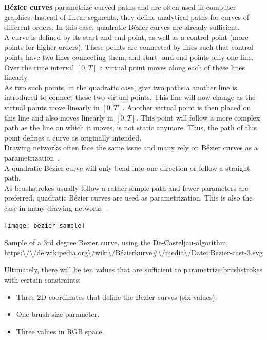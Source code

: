 \textbf{Bézier curves} parametrize curved paths and are often used in computer graphics.
Instead of linear segments, they define analytical paths for curves of different orders.
In this case, quadratic Bézier curves are already sufficient.\\
A curve is defined by its start and end point, as well as a control point (more points for higher orders).
These points are connected by lines such that control points have two lines connecting them, and start- and end points only one line.
Over the time interval $[0, T]$ a virtual point moves along each of these lines linearly.\\
As two such points, in the quadratic case, give two paths a another line is introduced to connect these two virtual points.
This line will now change as the virtual points move linearly in $[0, T]$.
Another virtual point is then placed on this line and also moves linearly in $[0, T]$.
This point will follow a more complex path as the line on which it moves, is not static anymore.
Thus, the path of this point defines a curve as originally intended.\\
Drawing networks often face the same issue and many rely on Bézier curves as a parametrization~\cite{SPIRAL, neuralpainters, learning2paint}.\\
A quadratic Bézier curve will only bend into one direction or follow a straight path.\\
As brushstrokes usually follow a rather simple path and fewer parameters are preferred, quadratic Bézier curves are used as parametrization.
This is also the case in many drawing networks~\cite{SPIRAL, neuralpainters, learning2paint}.
\begin{marginfigure}
    \texttt{[image: bezier\_sample]}
    \caption[]{Sample of a 3rd degree Bezier curve, using the De-Casteljau-algorithm, \url{https:\/\/de.wikipedia.org\/wiki\/Bézierkurve\#\/media\/Datei:Bezier-cast-3.svg}}
\end{marginfigure}

Ultimately, there will be ten values that are sufficient to parametrize brushstrokes with certain constraints:
\begin{itemize}
    \item Three 2D coordinates that define the Bezier curves (six values).
    \item One brush size parameter.
    \item Three values in RGB space.
\end{itemize}

